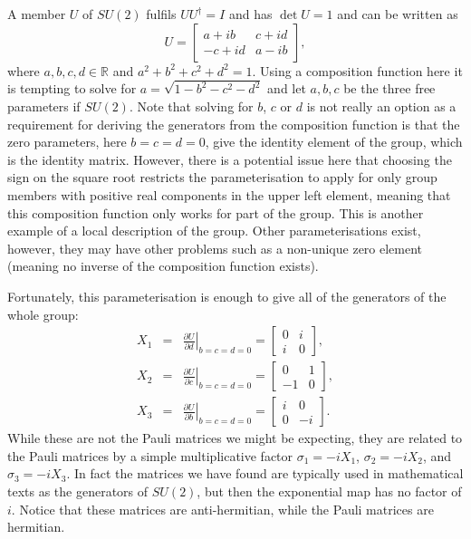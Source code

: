 \documentclass[notes.tex]{subfiles}
\begin{document}
\begin{Answer}
A member $U$ of $SU(2)$ fulfils $UU^\dagger=I$ and has $\det U =1$ and can be written as 
\[U=\left[\begin{matrix} a+ib & c+id \\ -c+id &  a-ib \end{matrix}\right],\] 
where $a,b,c,d\in\mathbb R$ and $a^2+b^2+c^2+d^2=1$. Using a composition function here it is tempting to solve for $a=\sqrt{1-b^2-c^2-d^2}$ and let $a,b,c$ be the three free parameters if $SU(2)$. Note that solving for $b$, $c$ or $d$ is not really an option as a requirement for deriving the generators from the composition function is that the zero parameters, here $b=c=d=0$, give the identity element of the group, which is the identity matrix. However, there is a potential issue here that choosing the sign on the square root restricts the parameterisation to apply for only group members with positive real components in the upper left element, meaning that this composition function only works for part of the group. This is another example of a local description of the group.  Other parameterisations exist, however, they may have other problems such as a non-unique zero element (meaning no inverse of the composition function exists).

Fortunately, this parameterisation is enough to give all of the generators of the whole group:
\begin{eqnarray*} 
X_1&=&\left.\frac{\partial U}{\partial  d}\right|_{b=c=d=0}=\left[\begin{matrix} 0 & i \\ i & 0 \end{matrix}\right], \\
X_2&=&\left.\frac{\partial U}{\partial  c}\right|_{b=c=d=0}=\left[\begin{matrix} 0 & 1 \\ -1 & 0 \end{matrix}\right], \\
X_3&=&\left.\frac{\partial U}{\partial  b}\right|_{b=c=d=0}=\left[\begin{matrix} i & 0 \\ 0 & -i \end{matrix}\right].
\end{eqnarray*} 
While these are not the Pauli matrices we might be expecting, they are related to the Pauli matrices by a simple multiplicative factor $\sigma_1=-iX_1$,  $\sigma_2=-iX_2$,  and $\sigma_3=-iX_3$. In fact the matrices we have found are typically used in mathematical texts as the generators of $SU(2)$, but then the exponential map has no factor of $i$. Notice that these matrices are anti-hermitian, while the Pauli matrices are hermitian.


\end{Answer}
\end{document}
